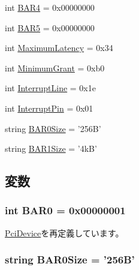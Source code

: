 \begin{DoxyCompactItemize}
\item 
int \hyperlink{classEthernet_1_1NSGigE_a563ca469426838df82cc266c302a0a70}{BAR4} = 0x00000000
\item 
int \hyperlink{classEthernet_1_1NSGigE_af86e51daee4f9d86104270e5ed9a0890}{BAR5} = 0x00000000
\item 
int \hyperlink{classEthernet_1_1NSGigE_a10460b79882894b983aca9f848f4ffaf}{MaximumLatency} = 0x34
\item 
int \hyperlink{classEthernet_1_1NSGigE_a1f3ebd5623021488fb0bfa84f5aa357d}{MinimumGrant} = 0xb0
\item 
int \hyperlink{classEthernet_1_1NSGigE_a4c885b3ef4f7d1a88903aabcce7a943e}{InterruptLine} = 0x1e
\item 
int \hyperlink{classEthernet_1_1NSGigE_a9b18e7e4ee8e0f835496c9106eb519d5}{InterruptPin} = 0x01
\item 
string \hyperlink{classEthernet_1_1NSGigE_aefc407ca01c833e5dac341709110c5e2}{BAR0Size} = '256B'
\item 
string \hyperlink{classEthernet_1_1NSGigE_afc69d648d33db96d14379bec42eb512e}{BAR1Size} = '4kB'
\end{DoxyCompactItemize}


\subsection{変数}
\hypertarget{classEthernet_1_1NSGigE_aa4b1656989a2151c14fc1d464df6531c}{
\subsubsection[{BAR0}]{\setlength{\rightskip}{0pt plus 5cm}int {\bf BAR0} = 0x00000001}}
\label{classEthernet_1_1NSGigE_aa4b1656989a2151c14fc1d464df6531c}


\hyperlink{classPci_1_1PciDevice_a60fb126d4d1fa61ee963a802485a62b3}{PciDevice}を再定義しています。\hypertarget{classEthernet_1_1NSGigE_aefc407ca01c833e5dac341709110c5e2}{
\subsubsection[{BAR0Size}]{\setlength{\rightskip}{0pt plus 5cm}string {\bf BAR0Size} = '256B'}}
\label{classEthernet_1_1NSGigE_aefc407ca01c833e5dac341709110c5e2}


